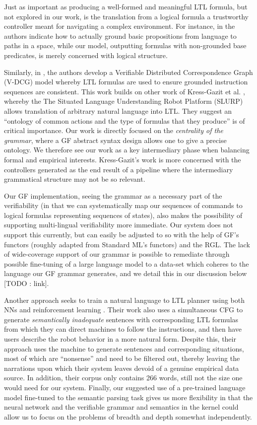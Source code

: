 \documentclass{article}
\begin{document}
Just as important as producing a well-formed and meaningful LTL formula, but not
explored in our work, is the translation from a logical formula a trustworthy
controller meant for navigating a complex environment. For instance, in
\cite{plaku2016motion} the authors indicate how to actually ground basic
propositions from language to paths in a space, while our model, outputting
formulas with non-grounded base predicates, is merely concerned with logical
structure.

Similarly, in \cite{7759412}, the authors develop a Verifiable Distributed
Correspondence Graph (V-DCG) model whereby LTL formulas are used to ensure
grounded instruction sequences are consistent. This work builds on other work of
Kress-Gazit et al. \cite{provCorrectNatControl}, whereby the The Situated
Language Understanding Robot Platform (SLURP) allows translation of arbitrary
natural language into LTL. They suggest an ``ontology of common actions and the
type of formulas that they produce'' is of critical importance. Our work is
directly focused on the \emph{centrality of the grammar}, where a GF abstract
syntax design allows one to give a precise ontology. We therefore see our work as
a key intermediary phase when balancing formal and empirical interests.
Kress-Gazit's work is more concerned with the controllers generated as the end
result of a pipeline where the intermediary grammatical structure may not be so
relevant.

Our GF implementation, seeing the grammar as a necessary part of the
verifiability (in that we can systematically map our sequences of commands to
logical formulas representing sequences of states), also makes the possibility of
supporting multi-lingual verifiability more immediate. Our system does not
support this currently, but can easily be adjusted to so with the help of GF's
functors (roughly adapted from Standard ML's functors) and the RGL. The lack of wide-coverage
support of our grammar is possible to remediate through possible fine-tuning of
a large language model to a data-set which coheres to the language our GF
grammar generates, and we detail this in our discussion below [TODO : link].

Another approach seeks to train a natural language to LTL planner using both NNs
and reinforcement learning \cite{ltlSemParse}. Their work also uses a
simultaneous CFG to generate \emph{semantically inadequate} sentences with
corresponding LTL formulas from which they can direct machines to follow the
instructions, and then have users describe the robot behavior in a more natural
form. Despite this, their approach uses the machine to generate sentences and
corresponding situations, most of which are ``nonsense'' and need to be filtered
out, thereby leaving the narrations upon which their system leaves devoid of a
genuine empirical data source. In addition, their corpus only contains 266
words, still not the size one would need for our system. Finally, our suggested
use of a pre-trained language model fine-tuned to the semantic parsing task
gives us more flexibility in that the neural network and the verifiable grammar
and semantics in the kernel could allow us to focus on the problems of breadth
and depth somewhat independently.
\end{document}
